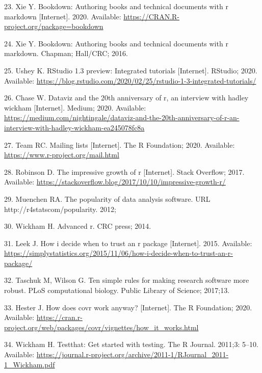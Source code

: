 \documentclass[10pt,letterpaper]{article}
\begin{document}
\leavevmode\hypertarget{ref-bookdown}{}%
23. Xie Y. Bookdown: Authoring books and technical documents with r
markdown {[}Internet{]}. 2020. Available:
\url{https://CRAN.R-project.org/package=bookdown}

\leavevmode\hypertarget{ref-xie2016}{}%
24. Xie Y. Bookdown: Authoring books and technical documents with r
markdown. Chapman; Hall/CRC; 2016.

\leavevmode\hypertarget{ref-ushey2020}{}%
25. Ushey K. RStudio 1.3 preview: Integrated tutorials {[}Internet{]}.
RStudio; 2020. Available:
\url{https://blog.rstudio.com/2020/02/25/rstudio-1-3-integrated-tutorials/}

\leavevmode\hypertarget{ref-chase2020}{}%
26. Chase W. Dataviz and the 20th anniversary of r, an interview with
hadley wickham {[}Internet{]}. Medium; 2020. Available:
\url{https://medium.com/nightingale/dataviz-and-the-20th-anniversary-of-r-an-interview-with-hadley-wickham-ea245078fc8a}

\leavevmode\hypertarget{ref-Rmail2020}{}%
27. Team RC. Mailing lists {[}Internet{]}. The R Foundation; 2020.
Available: \url{https://www.r-project.org/mail.html}

\leavevmode\hypertarget{ref-robinson2017}{}%
28. Robinson D. The impressive growth of r {[}Internet{]}. Stack
Overflow; 2017. Available:
\url{https://stackoverflow.blog/2017/10/10/impressive-growth-r/}

\leavevmode\hypertarget{ref-muenchen2012}{}%
29. Muenchen RA. The popularity of data analysis software. URL
http://r4statscom/popularity. 2012;

\leavevmode\hypertarget{ref-wickham2014}{}%
30. Wickham H. Advanced r. CRC press; 2014.

\leavevmode\hypertarget{ref-leek2015}{}%
31. Leek J. How i decide when to trust an r package {[}Internet{]}.
2015. Available:
\url{https://simplystatistics.org/2015/11/06/how-i-decide-when-to-trust-an-r-package/}

\leavevmode\hypertarget{ref-taschuk2017}{}%
32. Taschuk M, Wilson G. Ten simple rules for making research software
more robust. PLoS computational biology. Public Library of Science;
2017;13.

\leavevmode\hypertarget{ref-hester2020}{}%
33. Hester J. How does covr work anyway? {[}Internet{]}. The R
Foundation; 2020. Available:
\url{https://cran.r-project.org/web/packages/covr/vignettes/how_it_works.html}

\leavevmode\hypertarget{ref-wickham2011}{}%
34. Wickham H. Testthat: Get started with testing. The R Journal.
2011;3: 5--10. Available:
\url{https://journal.r-project.org/archive/2011-1/RJournal_2011-1_Wickham.pdf}
\end{document}
